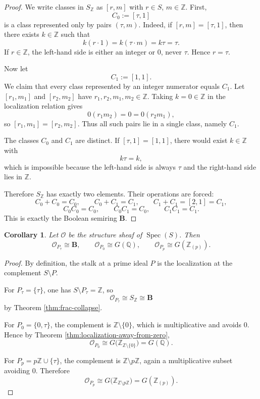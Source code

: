 \documentclass[11pt]{article}
\newtheorem{corollary}[theorem]{Corollary}
\theoremstyle{definition}
\newcommand{\Z}{\mathbb Z}
\newcommand{\Q}{\mathbb Q}
\newcommand{\B}{\mathbf B}
\newcommand{\Spec}{\operatorname{Spec}}
\newcommand{\cO}{\mathcal O}
\newcommand{\taup}{\tau}
\begin{document}
\begin{proof}
We write classes in \(S_{\Z}\) as \([r,m]\) with \(r\in S\), \(m\in\Z\).  First,
\[
C_0:=[\taup,1]
\]
is a class represented only by pairs \((\taup,m)\).  Indeed, if \([r,m]=[\taup,1]\), then there exists \(k\in\Z\) such that
\[
k(r\cdot 1)=k(\taup\cdot m)=k\taup=\taup.
\]
If \(r\in\Z\), the left-hand side is either an integer or \(0\), never \(\taup\).  Hence \(r=\taup\).

Now let
\[
C_1:=[1,1].
\]
We claim that every class represented by an integer numerator equals \(C_1\).  Let \([r_1,m_1]\) and \([r_2,m_2]\) have \(r_1,r_2,m_1,m_2\in\Z\).  Taking \(k=0\in\Z\) in the localization relation gives
\[
0(r_1m_2)=0=0(r_2m_1),
\]
so \([r_1,m_1]=[r_2,m_2]\).  Thus all such pairs lie in a single class, namely \(C_1\).

The classes \(C_0\) and \(C_1\) are distinct.  If \([\taup,1]=[1,1]\), there would exist \(k\in\Z\) with
\[
k\taup=k,
\]
which is impossible because the left-hand side is always \(\taup\) and the right-hand side lies in \(\Z\).

Therefore \(S_{\Z}\) has exactly two elements.  Their operations are forced:
\[
C_0+C_0=C_0,
\qquad
C_0+C_1=C_1,
\qquad
C_1+C_1=[2,1]=C_1,
\]
\[
C_0C_0=C_0,
\qquad
C_0C_1=C_0,
\qquad
C_1C_1=C_1.
\]
This is exactly the Boolean semiring \(\B\).
\end{proof}

\begin{corollary}\label{cor:stalks}
Let \(\cO\) be the structure sheaf of \(\Spec(S)\).  Then
\[
\cO_{P_{\taup}}\cong \B,
\qquad
\cO_{P_0}\cong G(\Q),
\qquad
\cO_{P_p}\cong G(\Z_{(p)}).
\]
\end{corollary}

\begin{proof}
By definition, the stalk at a prime ideal \(P\) is the localization at the complement \(S\setminus P\).

For \(P_{\taup}=\{\taup\}\), one has \(S\setminus P_{\taup}=\Z\), so
\[
\cO_{P_{\taup}}\cong S_{\Z}\cong \B
\]
by Theorem \ref{thm:frac-collapse}.

For \(P_0=\{0,\taup\}\), the complement is \(\Z\setminus\{0\}\), which is multiplicative and avoids \(0\).  Hence by Theorem \ref{thm:localization-away-from-zero},
\[
\cO_{P_0}\cong G\bigl(\Z_{\Z\setminus\{0\}}\bigr)=G(\Q).
\]

For \(P_p=p\Z\cup\{\taup\}\), the complement is \(\Z\setminus p\Z\), again a multiplicative subset avoiding \(0\).  Therefore
\[
\cO_{P_p}\cong G\bigl(\Z_{\Z\setminus p\Z}\bigr)=G(\Z_{(p)}).
\]
\end{proof}
\end{document}
